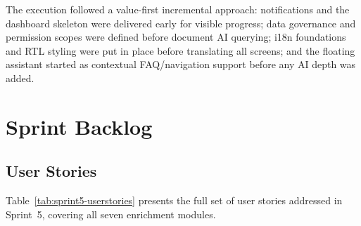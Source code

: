 \documentclass[a4paper,12pt]{report}
\begin{document}
The execution followed a value-first incremental approach: notifications and the dashboard
skeleton were delivered early for visible progress; data governance and permission scopes were
defined before document AI querying; i18n foundations and RTL styling were put in place before
translating all screens; and the floating assistant started as contextual FAQ/navigation
support before any AI depth was added.

\section{Sprint Backlog}
\label{sec:sprint5-backlog}

\subsection{User Stories}

Table~\ref{tab:sprint5-userstories} presents the full set of user stories addressed in
Sprint~5, covering all seven enrichment modules.
\end{document}
